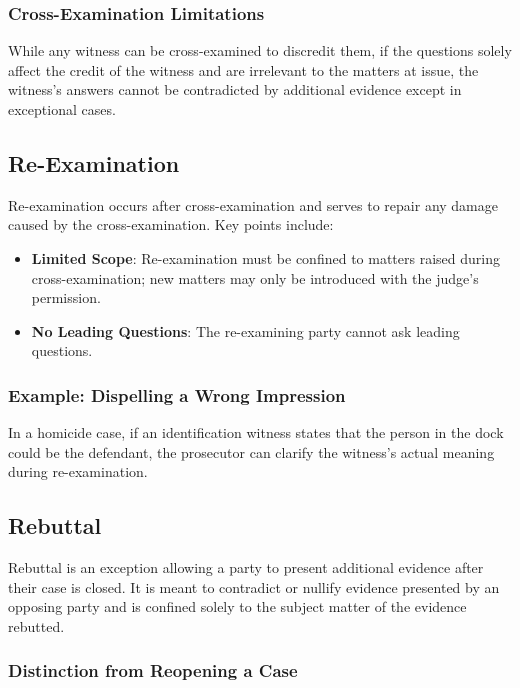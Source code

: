 \subsubsection{Cross-Examination
Limitations}\label{cross-examination-limitations}

While any witness can be cross-examined to discredit them, if the
questions solely affect the credit of the witness and are irrelevant to
the matters at issue, the witness's answers cannot be contradicted by
additional evidence except in exceptional cases.

\subsection{ Re-Examination}\label{re-examination}

Re-examination occurs after cross-examination and serves to repair any
damage caused by the cross-examination. Key points include:

\begin{itemize}
\tightlist
\item
  \textbf{Limited Scope}: Re-examination must be confined to matters
  raised during cross-examination; new matters may only be introduced
  with the judge's permission.
\item
  \textbf{No Leading Questions}: The re-examining party cannot ask
  leading questions.
\end{itemize}

\subsubsection{Example: Dispelling a Wrong
Impression}\label{example-dispelling-a-wrong-impression}

In a homicide case, if an identification witness states that the person
in the dock could be the defendant, the prosecutor can clarify the
witness's actual meaning during re-examination.

\subsection{ Rebuttal}\label{rebuttal}

Rebuttal is an exception allowing a party to present additional evidence
after their case is closed. It is meant to contradict or nullify
evidence presented by an opposing party and is confined solely to the
subject matter of the evidence rebutted.

\subsubsection{Distinction from Reopening a
Case}\label{distinction-from-reopening-a-case}

